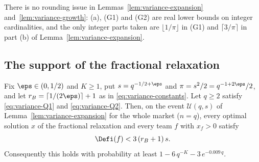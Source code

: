 There is no rounding issue in Lemmas~\ref{lem:variance-expansion}
and~\ref{lem:variance-growth}: (a), (G1) and (G2) are real lower bounds on integer
cardinalities, and the only integer parts taken are $\lfloor1/\pi\rfloor$ in (G1) and
$\lceil3/\pi\rceil$ in part (b) of Lemma~\ref{lem:variance-expansion}.

\subsection{The support of the fractional relaxation}\label{sec:variance-lpsupport}

\begin{proposition}\label{prop:variance-lpsupport}
Fix $\eps\in(0,1/2)$ and $K\ge1$, put $s=q^{-1/2+\eps}$ and $\pi=s^2/2=q^{-1+2\eps}/2$, and
let $r_B=\lceil1/(2\eps)\rceil+1$ as in \eqref{eq:variance-constants}. Let $q\ge2$ satisfy
\eqref{eq:variance-Q1} and \eqref{eq:variance-Q2}. Then, on the event $\mathcal U(q,s)$ of
Lemma~\ref{lem:variance-expansion} for the whole market \textup{(}$n=q$\textup{)}, every
optimal solution $x$ of the fractional relaxation and every team $f$ with $x_f>0$ satisfy
\[
\Defi(f)<3\,(r_B+1)\,s .
\]
Consequently this holds with probability at least $1-6\,q^{-K}-3\,e^{-0.009\,q}$.
\end{proposition}

